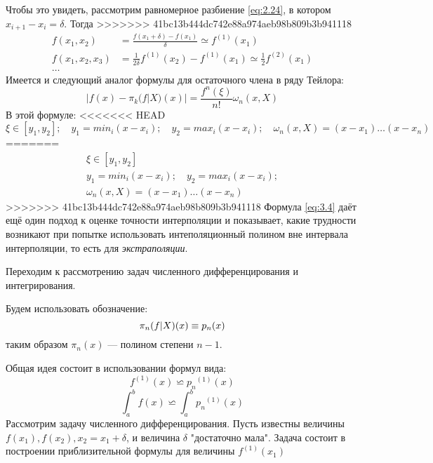 Чтобы это увидеть, рассмотрим равномерное разбиение \ref{eq:2.24}, в котором $x_{i+1}-x_i=\delta$. Тогда 
>>>>>>> 41bc13b444dc742e88a974aeb98b809b3b941118
\begin{dmath}
\begin{aligned}
	f(x_1, x_2) &= \frac{f(x_1+\delta) - f(x_1)}{\delta} \simeq f^{(1)}(x_1) \\
	f(x_1, x_2, x_3) &= \frac{1}{2\delta}f^{(1)}(x_2)-f^{(1)}(x_1) \simeq  \frac{1}{2}f^{(2)}(x_1) \\
	\dots
\end{aligned}
\end{dmath}
Имеется и следующий аналог формулы для остаточного члена в ряду Тейлора:
\begin{equation} \label{eq:3.4}
	|f(x) - \pi_k(f|X)(x)| = \frac{f^{n}(\xi)}{n!} \omega_n (x,X)
\end{equation}
В этой формуле:
<<<<<<< HEAD
\begin{equation}
	\xi \in [y_1, y_2] ;\quad y_1=min_{i}(x-x_i) ;\quad y_2=max_{i}(x-x_i) ;\quad \omega_n(x, X) = (x-x_1)\dots(x-x_n)
\end{equation}
=======
\begin{align}
	\xi \in [y_1, y_2]  \\
	y_1=min_{i}(x-x_i) ;\quad y_2=max_{i}(x-x_i) ;\\ 
	\omega_n(x, X) = (x-x_1)\dots(x-x_n)
\end{align}
>>>>>>> 41bc13b444dc742e88a974aeb98b809b3b941118
Формула \ref{eq:3.4} даёт ещё один подход к оценке точности интерполяции и показывает, какие трудности возникают при попытке использовать интеполяционный полином вне интервала интерполяции, то есть для \textit{экстраполяции}.

\bigskip
Переходим к рассмотрению задач численного дифференцирования и интегрирования. 

Будем использовать обозначение:
\begin{equation}
	\pi_n(f|X)(x) \equiv p_n(x)\\
\end{equation}
таким образом $\pi_n(x)$ --- полином степени $n-1$.

Общая идея состоит в использовании формул вида: 
\begin{equation}
	f^{(1)}(x) \backsimeq {p_n}^{(1)}(x)
\end{equation}
\begin{equation}
	\int_{a}^{b}f(x) \backsimeq \int_{a}^{b}{p_n}^{(1)}(x)
\end{equation}
Рассмотрим задачу численного дифференцирования. Пусть известны величины $f(x_1), f(x_2), x_2 = x_1 + \delta$, и величина $\delta$ "достаточно мала". Задача состоит в построении приблизительной формулы для величины $f^{(1)}(x_1)$

